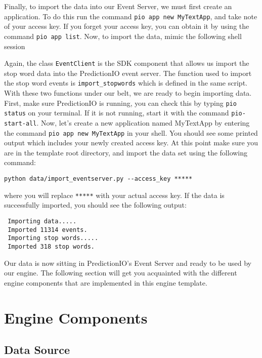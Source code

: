 \documentclass[a4paper,12pt]{article}
\renewcommand{\tt}[1]{\texttt{#1}}
\newcommand{\3}{\left}
\newcommand{\4}{\right}
\renewcommand{\-}[1]{{}^{-#1}}
\begin{document}
Finally, to import the data into our Event Server, we must first create an application. To do this run the command \tt{pio app new MyTextApp}, and take note of your access key. If you forget your access key, you can obtain it by using the command \tt{pio app list}. Now, to import the data, mimic the following shell session

Again, the class \tt{EventClient} is the SDK component that allows us import the stop word data into the PredictionIO event server. The function used to import the stop word events is \tt{import\_stopwords} which is defined in the same script. With these two functions under our belt, we are ready to begin importing data. First, make sure PredictionIO is running, you can check this by typing \tt{pio status} on your terminal. If it is not running, start it with the command \tt{pio-start-all}. Now, let's create a new application named MyTextApp by entering the command \tt{pio app new MyTextApp} in your shell. You should see some printed output which includes your newly created access key. At this point make sure you are in the template root directory, and import the data set using the following command:

\begin{verbatim}
python data/import_eventserver.py --access_key *****
\end{verbatim}

where you will replace \tt{*****} with your actual access key. If the data is successfully imported, you should see the following output:
 
 \begin{verbatim}
 Importing data.....
 Imported 11314 events.
 Importing stop words.....
 Imported 318 stop words.
 \end{verbatim}
 
Our data is now sitting in PredictionIO's Event Server and ready to be used by our engine. The following section will get you acquainted with the different engine components that are implemented in this engine template.

\break

\section*{Engine Components}

\subsection*{Data Source}
\end{document}
